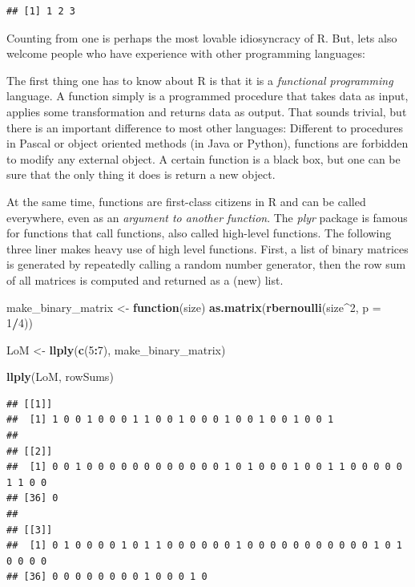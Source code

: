 \documentclass[]{svmono}
\newenvironment{Shaded}{\begin{snugshade}}{\end{snugshade}}
\newcommand{\KeywordTok}[1]{\textcolor[rgb]{0.13,0.29,0.53}{\textbf{#1}}}
\newcommand{\DataTypeTok}[1]{\textcolor[rgb]{0.13,0.29,0.53}{#1}}
\newcommand{\DecValTok}[1]{\textcolor[rgb]{0.00,0.00,0.81}{#1}}
\newcommand{\StringTok}[1]{\textcolor[rgb]{0.31,0.60,0.02}{#1}}
\newcommand{\ControlFlowTok}[1]{\textcolor[rgb]{0.13,0.29,0.53}{\textbf{#1}}}
\newcommand{\OperatorTok}[1]{\textcolor[rgb]{0.81,0.36,0.00}{\textbf{#1}}}
\newcommand{\NormalTok}[1]{#1}
\theoremstyle{definition}
\theoremstyle{definition}
\theoremstyle{definition}
\theoremstyle{remark}
\begin{document}
\begin{verbatim}
## [1] 1 2 3
\end{verbatim}

Counting from one is perhaps the most lovable idiosyncracy of R. But,
lets also welcome people who have experience with other programming
languages:

The first thing one has to know about R is that it is a \emph{functional
programming} language. A function simply is a programmed procedure that
takes data as input, applies some transformation and returns data as
output. That sounds trivial, but there is an important difference to
most other languages: Different to procedures in Pascal or object
oriented methods (in Java or Python), functions are forbidden to modify
any external object. A certain function is a black box, but one can be
sure that the only thing it does is return a new object.

At the same time, functions are first-class citizens in R and can be
called everywhere, even as an \emph{argument to another function}. The
\emph{plyr} package is famous for functions that call functions, also
called high-level functions. The following three liner makes heavy use
of high level functions. First, a list of binary matrices is generated
by repeatedly calling a random number generator, then the row sum of all
matrices is computed and returned as a (new) list.

\begin{Shaded}
\begin{Highlighting}[]
\NormalTok{make_binary_matrix <-}\StringTok{ }
\StringTok{  }\ControlFlowTok{function}\NormalTok{(size) }\KeywordTok{as.matrix}\NormalTok{(}\KeywordTok{rbernoulli}\NormalTok{(size}\OperatorTok{^}\DecValTok{2}\NormalTok{, }\DataTypeTok{p =} \DecValTok{1}\OperatorTok{/}\DecValTok{4}\NormalTok{))}

\NormalTok{LoM <-}\StringTok{ }\KeywordTok{llply}\NormalTok{(}\KeywordTok{c}\NormalTok{(}\DecValTok{5}\OperatorTok{:}\DecValTok{7}\NormalTok{), make_binary_matrix)}

\KeywordTok{llply}\NormalTok{(LoM, rowSums)}
\end{Highlighting}
\end{Shaded}

\begin{verbatim}
## [[1]]
##  [1] 1 0 0 1 0 0 0 1 1 0 0 1 0 0 0 1 0 0 1 0 0 1 0 0 1
## 
## [[2]]
##  [1] 0 0 1 0 0 0 0 0 0 0 0 0 0 0 0 1 0 1 0 0 0 1 0 0 1 1 0 0 0 0 0 1 1 0 0
## [36] 0
## 
## [[3]]
##  [1] 0 1 0 0 0 0 1 0 1 1 0 0 0 0 0 0 1 0 0 0 0 0 0 0 0 0 0 0 1 0 1 0 0 0 0
## [36] 0 0 0 0 0 0 0 0 1 0 0 0 1 0
\end{verbatim}
\end{document}
